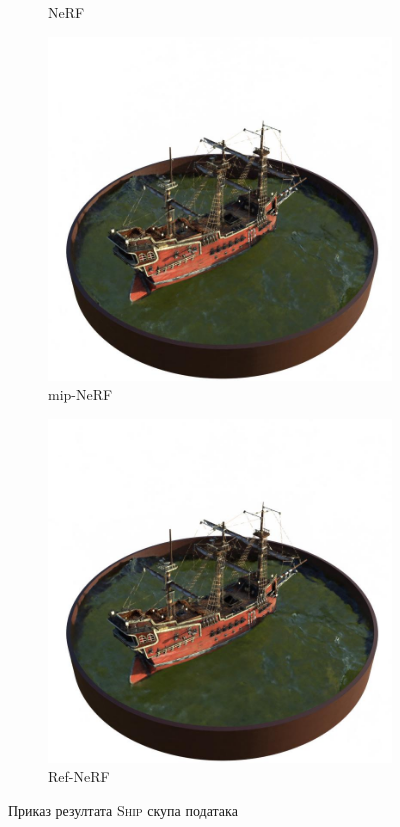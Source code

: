 \documentclass[12pt, a4paper, twoside]{book}
\numberwithin{equation}{chapter}
\numberwithin{theorem}{section}
\numberwithin{definition}{section}
\numberwithin{definitionChapter}{chapter}
\begin{document}
\begin{figure}[H]
\begin{subfigure}{0.475\textwidth}
			\caption{NeRF}
		\end{subfigure}
		\begin{subfigure}{0.475\textwidth}
			\centering
			\includegraphics[scale=0.25]{img/mipnerf/mipnerf_ship_38.jpg}
			\caption{mip-NeRF}
		\end{subfigure}
		\begin{subfigure}{0.475\textwidth}
			\centering
			\includegraphics[scale=0.25]{img/refnerf/refnerf_ship_38.jpg}
			\caption{Ref-NeRF}
		\end{subfigure}
		\caption{Приказ резултата \textsc{Ship} скупа података}
		\label{fig-ship-results}
	\end{figure}
\end{document}
